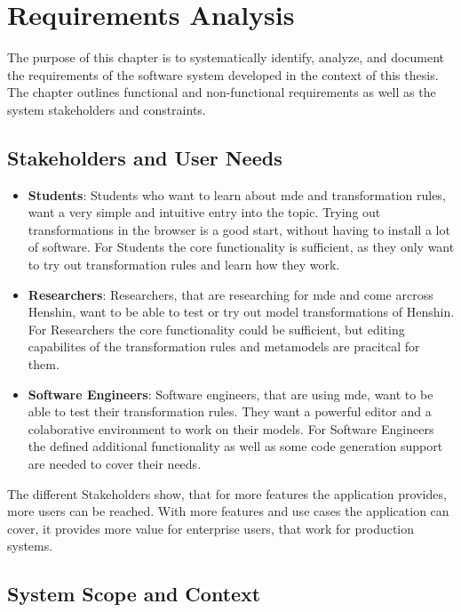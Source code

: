   \section{Requirements Analysis}
  \label{subsec:requirements}

  The purpose of this chapter is to systematically identify, analyze, and document the requirements of the software system developed in the context of this thesis. The chapter outlines functional and non-functional requirements as well as the system stakeholders and constraints.

\subsection{Stakeholders and User Needs}
  \label{subsec:stakeholders}

  \begin{itemize}
    \item \textbf{Students}: Students who want to learn about \ac{mde} and transformation rules, want a very simple and intuitive entry into the topic. Trying out transformations in the browser is a good start, without having to install a lot of software. For Students the core functionality is sufficient, as they only want to try out transformation rules and learn how they work.
    \item \textbf{Researchers}: Researchers, that are researching for \ac{mde} and come arcross Henshin, want to be able to test or try out model transformations of Henshin. For Researchers the core functionality could be sufficient, but editing capabilites of the transformation rules and metamodels are pracitcal for them.
    \item \textbf{Software Engineers}: Software engineers, that are using \ac{mde}, want to be able to test their transformation rules. They want a powerful editor and a colaborative environment to work on their models. For Software Engineers the defined additional functionality as well as some code generation support are needed to cover their needs.
  \end{itemize}

  The different Stakeholders show, that for more features the application provides, more users can be reached. With more features and use cases the application can cover, it provides more value for enterprise users, that work for production systems.

  \subsection{System Scope and Context}
  \label{subsec:system-scope}

